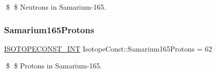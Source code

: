 \$ \$ Neutrons in Samarium-\/165. \mbox{\label{group___isotope_const-_samarium-_sm165_ga2b02df0fa176a73706e1dd4ca63b0881}} 
\subsubsection{\texorpdfstring{Samarium165\+Protons}{Samarium165Protons}}
{\footnotesize\ttfamily \mbox{\hyperlink{group___isotope_const-_macros_ga5f18360b3e99483a35c32d789e62621c}{I\+S\+O\+T\+O\+P\+E\+C\+O\+N\+S\+T\+\_\+\+I\+NT}} Isotope\+Const\+::\+Samarium165\+Protons = 62}

\$ \$ Protons in Samarium-\/165. 